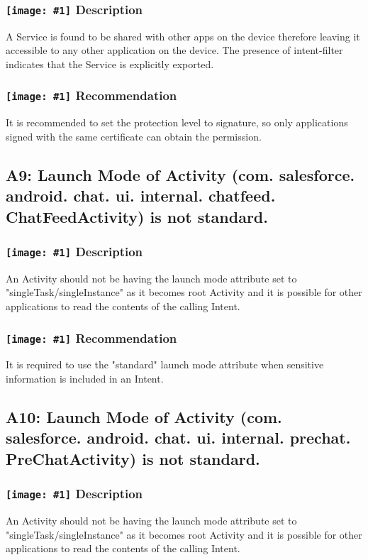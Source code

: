 \documentclass[12p]{article}
\newcommand{\icon}[1]{\texttt{[image: \#1]}}
\begin{document}
\subsubsection*{\protect\icon{/home/miki/Documents/GITHUB/AndroidPermissions/python/vulns/report_icons/basic_sheet.png} Description}
A  Service is found to be shared with other apps on the device therefore leaving it accessible to any other application on the device. The presence of intent-filter indicates that the Service is explicitly exported.
\subsubsection*{\protect\icon{/home/miki/Documents/GITHUB/AndroidPermissions/python/vulns/report_icons/basic_todo.png} Recommendation}
It is recommended to set the protection level to signature, so only applications signed with the same certificate can obtain the permission.
\subsection{A9: Launch Mode of Activity (com. salesforce. android. chat. ui. internal. chatfeed. ChatFeedActivity) is not standard.}
\subsubsection*{\protect\icon{/home/miki/Documents/GITHUB/AndroidPermissions/python/vulns/report_icons/basic_sheet.png} Description}
An Activity should not be having the launch mode attribute set to "singleTask/singleInstance" as it becomes root Activity and it is possible for other applications to read the contents of the calling Intent.
\subsubsection*{\protect\icon{/home/miki/Documents/GITHUB/AndroidPermissions/python/vulns/report_icons/basic_todo.png} Recommendation}
It is required to use the "standard" launch mode attribute when sensitive information is included in an Intent.
\subsection{A10: Launch Mode of Activity (com. salesforce. android. chat. ui. internal. prechat. PreChatActivity) is not standard.}
\subsubsection*{\protect\icon{/home/miki/Documents/GITHUB/AndroidPermissions/python/vulns/report_icons/basic_sheet.png} Description}
An Activity should not be having the launch mode attribute set to "singleTask/singleInstance" as it becomes root Activity and it is possible for other applications to read the contents of the calling Intent.
\end{document}
